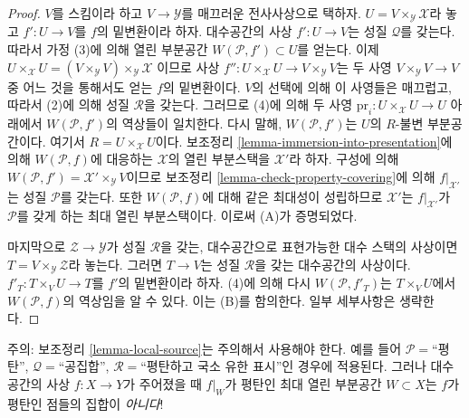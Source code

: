 \begin{proof}
$V$를 스킴이라 하고 $V \to \mathcal{Y}$를 매끄러운 전사사상으로 택하자.
$U = V \times_\mathcal{Y} \mathcal{X}$라 놓고 $f' : U \to V$를
$f$의 밑변환이라 하자. 대수공간의 사상 $f' : U \to V$는
성질 $\mathcal{Q}$를 갖는다. 따라서 가정 (3)에 의해 열린 부분공간
$W(\mathcal{P}, f') \subset U$를 얻는다. 이제
$U \times_\mathcal{X} U =
(V \times_\mathcal{Y} V) \times_\mathcal{Y} \mathcal{X}$
이므로 사상 $f'' : U \times_\mathcal{X} U \to V \times_\mathcal{Y} V$는
두 사영 $V \times_\mathcal{Y} V \to V$ 중 어느 것을 통해서도 얻는
$f$의 밑변환이다. $V$의 선택에 의해 이 사영들은 매끄럽고,
따라서 (2)에 의해 성질 $\mathcal{R}$을 갖는다. 그러므로 (4)에 의해
두 사영 $\text{pr}_i : U \times_\mathcal{X} U \to U$ 아래에서
$W(\mathcal{P}, f')$의 역상들이 일치한다. 다시 말해,
$W(\mathcal{P}, f')$는 $U$의 $R$-불변 부분공간이다. 여기서
$R = U \times_\mathcal{X} U$이다.
보조정리 \ref{lemma-immersion-into-presentation}에 의해
$W(\mathcal{P}, f)$에 대응하는 $\mathcal{X}$의 열린 부분스택을
$\mathcal{X}'$라 하자. 구성에 의해
$W(\mathcal{P}, f') = \mathcal{X}' \times_\mathcal{Y} V$이므로
보조정리 \ref{lemma-check-property-covering}에 의해
$f|_{\mathcal{X}'}$는 성질 $\mathcal{P}$를 갖는다.
또한 $W(\mathcal{P}, f)$에 대해 같은 최대성이 성립하므로
$\mathcal{X}'$는 $f|_{\mathcal{X}'}$가 $\mathcal{P}$를 갖게 하는
최대 열린 부분스택이다. 이로써 (A)가 증명되었다.

\medskip\noindent
마지막으로 $\mathcal{Z} \to \mathcal{Y}$가 성질 $\mathcal{R}$을 갖는,
대수공간으로 표현가능한 대수 스택의 사상이면
$T = V \times_\mathcal{Y} \mathcal{Z}$라 놓는다. 그러면
$T \to V$는 성질 $\mathcal{R}$을 갖는 대수공간의 사상이다.
$f'_T : T \times_V U \to T$를 $f'$의 밑변환이라 하자.
(4)에 의해 다시 $W(\mathcal{P}, f'_T)$는 $T \times_V U$에서
$W(\mathcal{P}, f)$의 역상임을 알 수 있다. 이는 (B)를 함의한다.
일부 세부사항은 생략한다.
\end{proof}

\begin{remark}
\label{remark-local-source-warning}
주의:
보조정리 \ref{lemma-local-source}는 주의해서 사용해야 한다.
예를 들어 $\mathcal{P}=$``평탄'', $\mathcal{Q}=$``공집합'',
$\mathcal{R}=$``평탄하고 국소 유한 표시''인 경우에 적용된다.
그러나 대수공간의 사상 $f : X \to Y$가 주어졌을 때
$f|_W$가 평탄인 최대 열린 부분공간 $W \subset X$는
$f$가 평탄인 점들의 집합이 {\it 아니다}!
\end{remark}

